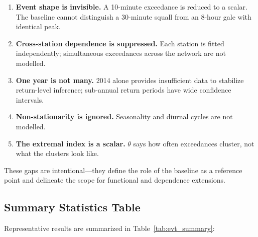 \begin{enumerate}
    \item \textbf{Event shape is invisible.} A 10-minute exceedance is reduced to a scalar. The baseline cannot distinguish a 30-minute squall from an 8-hour gale with identical peak.
    \item \textbf{Cross-station dependence is suppressed.} Each station is fitted independently; simultaneous exceedances across the network are not modelled.
    \item \textbf{One year is not many.} 2014 alone provides insufficient data to stabilize return-level inference; sub-annual return periods have wide confidence intervals.
    \item \textbf{Non-stationarity is ignored.} Seasonality and diurnal cycles are not modelled.
    \item \textbf{The extremal index is a scalar.} $\theta$ says how often exceedances cluster, not what the clusters look like.
\end{enumerate}

These gaps are intentional—they define the role of the baseline as a reference point and delineate the scope for functional and dependence extensions.

\subsection{Summary Statistics Table}

Representative results are summarized in Table~\ref{tab:evt_summary}:

